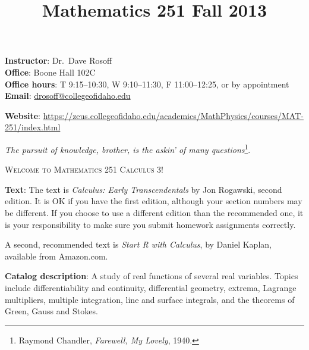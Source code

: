 \documentclass[12pt,twoside]{amsart}
\title{{\LARGE Mathematics 251 \hfill Fall 2013}}
\begin{document}
\maketitle
\thispagestyle{empty}
\vspace*{-2ex}
\begin{minipage}[t]{0.45\linewidth}
    \textbf{Instructor}: Dr.\ Dave Rosoff  \\
    \textbf{Office}: Boone Hall 102C \\
    \textbf{Office hours}: T 9:15--10:30, W 9:10--11:30, F 11:00--12:25, or by appointment \\
    \textbf{Email}: \href{mailto:drosoff@collegeofidaho.edu}{drosoff@collegeofidaho.edu} \\
\end{minipage} 
\hspace*{0.09\linewidth}
\begin{minipage}[t]{0.45\linewidth}\begin{flushright}
    \textbf{Website}: \url{https://zeus.collegeofidaho.edu/academics/MathPhysics/courses/MAT-251/index.html}
\end{flushright}
\end{minipage}
\vspace*{-2ex}
\begin{center}

{\large \emph{The pursuit of knowledge, brother, is the askin' of many questions}\footnote{Raymond Chandler, \emph{Farewell, My Lovely}, 1940.}}.

{\LARGE \textsc{Welcome to Mathematics 251 Calculus 3!}}

\end{center}


\textbf{Text}: The text is \emph{Calculus: Early Transcendentals} by Jon Rogawski, second edition. It is OK if you have the first edition, although your section numbers may be different. If you choose to use a different edition than the recommended one, it is your responsibility to make sure you submit homework assignments correctly. 

A second, recommended text is \emph{Start R with Calculus}, by Daniel Kaplan, available from Amazon.com.

\textbf{Catalog description}: A study of real functions of several real variables. Topics include differentiability and continuity, differential geometry, extrema, Lagrange multipliers, multiple integration, line and surface integrals, and the theorems of Green, Gauss and Stokes. 
\end{document}
